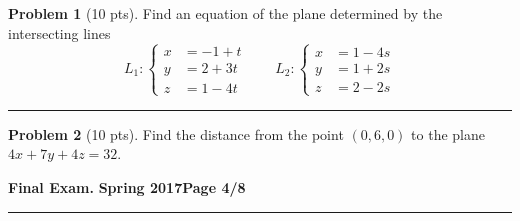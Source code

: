 \documentclass[12pt]{article}
\theoremstyle{definition}
\newtheorem{problem}{Problem}
\begin{document}
\bigskip
\begin{problem}[10 pts]
Find an equation of the plane determined by the intersecting lines
\begin{equation*}
L_1: \begin{cases}
x &= -1+t \\
y &= 2+3t \\
z &= 1-4t
\end{cases} \qquad
L_2: \begin{cases}
x &= 1 - 4s \\
y &= 1 + 2s \\
z &= 2 - 2s
\end{cases}
\end{equation*}
\vspace{8.5cm}
\begin{flushright}
\end{flushright}
\end{problem}
\hrule
\begin{problem}[10 pts]
Find the distance from the point $(0,6,0)$ to the plane $4x+7y+4z=32$.
\vspace{7.75cm}
\begin{flushright}
\end{flushright}
\end{problem}
\newpage

\hfill{\large\bf Final Exam.}\hfill{\large\bf
  Spring 2017}\hfill{\large\bf Page 4/8}\hrule
\end{document}
